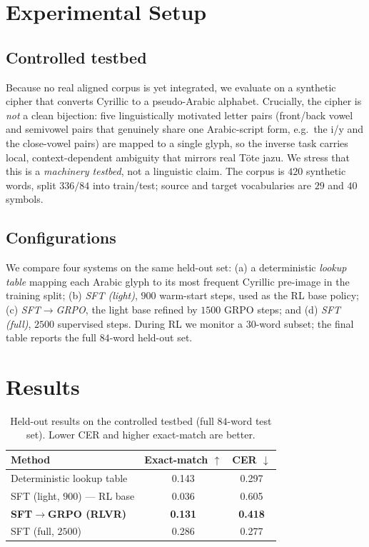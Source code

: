 \documentclass[conference]{IEEEtran}
\begin{document}
\section{Experimental Setup}
\subsection{Controlled testbed}
Because no real aligned corpus is yet integrated, we evaluate on a synthetic
cipher that converts Cyrillic to a pseudo-Arabic alphabet. Crucially, the cipher
is \emph{not} a clean bijection: five linguistically motivated letter pairs
(front/back vowel and semivowel pairs that genuinely share one Arabic-script form,
e.g.\ the i/y and the close-vowel pairs) are mapped to a single glyph, so the
inverse task carries local, context-dependent ambiguity that mirrors real
T\"ote jazu. We stress that this is a \emph{machinery testbed}, not a linguistic
claim. The corpus is $420$ synthetic words, split $336/84$ into train/test;
source and target vocabularies are $29$ and $40$ symbols.

\subsection{Configurations}
We compare four systems on the same held-out set: (a) a deterministic
\emph{lookup table} mapping each Arabic glyph to its most frequent Cyrillic
pre-image in the training split; (b) \emph{SFT (light)}, $900$ warm-start steps,
used as the RL base policy; (c) \emph{SFT$\rightarrow$GRPO}, the light base
refined by $1500$ GRPO steps; and (d) \emph{SFT (full)}, $2500$ supervised steps.
During RL we monitor a $30$-word subset; the final table reports the full
$84$-word held-out set.

\section{Results}
\begin{table}[t]
\caption{Held-out results on the controlled testbed (full $84$-word test set).
Lower CER and higher exact-match are better.}
\label{tab:main}
\centering
\begin{tabular}{lcc}
\toprule
Method & Exact-match $\uparrow$ & CER $\downarrow$ \\
\midrule
Deterministic lookup table        & 0.143 & 0.297 \\
SFT (light, $900$) --- RL base     & 0.036 & 0.605 \\
\textbf{SFT$\rightarrow$GRPO (RLVR)} & \textbf{0.131} & \textbf{0.418} \\
SFT (full, $2500$)                 & 0.286 & 0.277 \\
\bottomrule
\end{tabular}
\end{table}
\end{document}
